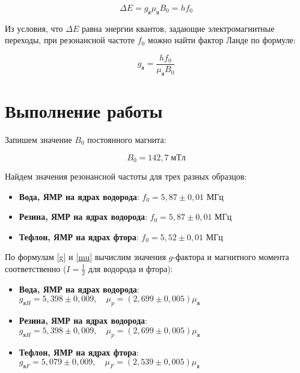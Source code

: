 \documentclass[12pt]{kiarticle} %
\begin{document}
	\begin{equation}\label{}
	\Delta E = g_я \mu_я B_0 = hf_0
	\end{equation}
	
	Из условия, что $ \Delta E $ равна энергии квантов, задающие электромагнитные переходы, при резонансной частоте $ f_0 $ можно найти фактор Ланде по формуле:
	
	\begin{equation}\label{g}
	g_{я} = \dfrac{hf_0}{\mu_я B_0} 
	\end{equation}

	
	\section{Выполнение работы}
	
	Запишем значение $ B_0 $ постоянного магнита:
	
	\begin{equation}\label{}
	B_0 = 142,7 \; мТл
	\end{equation} 
	
	Найдем значения резонансной частоты для трех разных образцов:
	
	\begin{itemize}
		\item \textbf{Вода, ЯМР на ядрах водорода}: $ f_0 = 5,87 \pm 0,01 $ МГц
			
		\item \textbf{Резина, ЯМР на ядрах водорода}: $ f_0 = 5,87 \pm 0,01 $ МГц
			
		\item \textbf{Тефлон, ЯМР на ядрах фтора}: $ f_0 = 5,52 \pm 0,01 $ МГц
	\end{itemize}
	
	По формулам \eqref{g} и \eqref{mu} вычислим значения $ g $-фактора и магнитного момента соответственно ($ I = \frac{1}{2} $ для водорода и фтора): 
	
	\begin{itemize}
		\item \textbf{Вода, ЯМР на ядрах водорода}: $ g_{яH} = 5,398 \pm 0,009, \quad \mu_p  = (2,699 \pm 0,005)\mu_я $ 
		
		\item \textbf{Резина, ЯМР на ядрах водорода}: $ g_{яH} = 5,398 \pm 0,009, \quad \mu_p   = (2,699 \pm 0,005)\mu_я  $ 
		
		\item \textbf{Тефлон, ЯМР на ядрах фтора}: $ g_{яF} = 5,079 \pm 0,009, \quad \mu_F  = (2,539 \pm 0,005)\mu_я  $ 
	\end{itemize}
\end{document}
